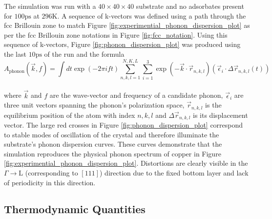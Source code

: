 The simulation was run with a $40\times40\times40$ substrate and no adsorbates present for $100\si{\pico\second}$ at $296\si{\kelvin}$. A sequence of k-vectors was defined using a path through the fcc Brillouin zone to match Figure \ref{fig:experimential_phonon_dispersion_plot} as per the fcc Brillouin zone notations in Figure \ref{fig:fcc_notation}. Using this sequence of k-vectors, Figure \ref{fig:phonon_dispersion_plot} was produced using the last $10\si{\pico\second}$ of the run and the formula
\begin{equation}
	A_{\text{phonon}}\left(\vec{k}, f\right) = \int dt \exp\left(-2\pi i ft\right) \sum_{n,k,l=1}^{N,K,L}\sum_{i=1}^3\exp\left(-\vec{k}\cdot\vec{r}_{n,k,l}\right)\left(\vec{\epsilon}_i\cdot\Delta\vec{r}_{n,k,l}\left(t\right)\right)
\end{equation}
\\
where $\vec{k}$ and $f$ are the wave-vector and frequency of a candidate phonon, $\vec{\epsilon}_i$ are three unit vectors spanning the phonon's polarization space, $\vec{r}_{n,k,l}$ is the equilibrium position of the atom with index $n,k,l$ and $\Delta\vec{r}_{n,k,l}$ is its displacement vector. The large red crosses in Figure \ref{fig:phonon_dispersion_plot} correspond to stable modes of oscillation of the crystal and therefore illuminate the substrate's phonon dispersion curves. These curves demonstrate that the simulation reproduces the physical phonon spectrum of copper in Figure \ref{fig:experimential_phonon_dispersion_plot}. Distortions are clearly visible in the $\Gamma\rightarrow\mathrm{L}$ (corresponding to $\left[111\right]$) direction due to the fixed bottom layer and lack of periodicity in this direction. 

\subsection{Thermodynamic Quantities}


